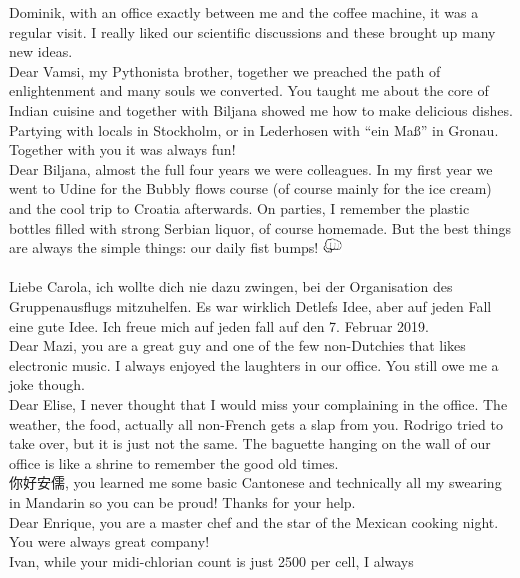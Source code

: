 \mf{\flagus}\indent Dominik, with an office exactly between me and the coffee
machine, it was a regular visit. I really liked our scientific discussions and
these brought up many new ideas.\\
\indent Dear Vamsi, my Pythonista brother, together we preached the path of
enlightenment and many souls we converted. You taught me about the core of
Indian cuisine and together with Biljana showed me how to make delicious
dishes. Partying with locals in Stockholm, or in Lederhosen with ``ein
Ma{\ss}'' in Gronau. Together with you it was always fun!\\
\indent Dear Biljana, almost the full four years we were colleagues. In my first
year we went to Udine for the Bubbly flows course (of course mainly for the
ice cream) and the cool trip to Croatia afterwards. On parties, I remember the
plastic bottles filled with strong Serbian liquor, of course homemade. But the
best things are always the simple things: our daily fist bumps! %
\includegraphics[height=4mm]{fig/fistbump.jpg}\\\\
\mfl{\flagdet}\indent Liebe Carola, ich wollte dich nie dazu zwingen, bei der
Organisation des Gruppenausflugs mitzuhelfen. Es war wirklich Detlefs Idee,
aber auf jeden Fall eine gute Idee. Ich freue mich auf jeden fall auf den 7.
Februar 2019.\\
\mfl{\flagusa}\indent Dear Mazi, you are a great guy and one of the few
non-Dutchies that likes electronic music. I always enjoyed the laughters in our
office. You still owe me a joke though.\\
\indent Dear Elise, I never thought that I would miss your complaining
in the office. The weather, the food, actually all non-French gets a slap from
you. Rodrigo tried to take over, but it is just not the same. The baguette
hanging on the wall of our office is like a shrine to remember the good old
times.\\
\indent 你好安儒, you learned me some basic Cantonese and technically all my
swearing in Mandarin so you can be proud! Thanks for your help.\\ 
\indent Dear Enrique, you are a master chef and the star of the Mexican
cooking night. You were always great company!\\ 
\indent Ivan, while your midi-chlorian count is just 2500 per cell, I always
